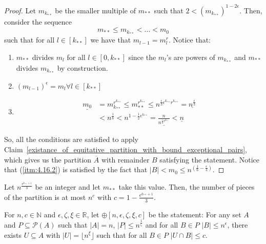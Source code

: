         \begin{proof}
            Let $m_{k_{**}}$ be the smaller multiple of $m_{**}$ such that $2 < (m_{k_{**}})^{1-2\epsilon}$.
            Then, consider the sequence
                \[
                    m_{**} \leq m_{k_{**}} < \dots < m_0
                \]
                such that for all $l \in [k_{**}]$ we have that $m_{l-1} = m_l^r$.
            Notice that:
            \begin{enumerate}
                \item $m_{**}$ divides $m_l$ for all $l \in [0, k_{**}]$ since the $m_l$'s are powers of $m_{k_{**}}$
                    and $m_{**}$ divides $m_{k_{**}}$ by construction.
                \item $(m_{l-1})^\epsilon = m_l \forall l \in [k_{**}]$
                \item \[
                    \begin{split}
                        \underline{m_0}
                            & = m_{k_{**}}^{r^{k_{**}}}
                                \leq m_{**}^{r^{k_{**}}}
                                \leq n^{\frac{\epsilon}{3}\epsilon^{k_{**}}r^{k_{**}}}
                                = \underline{n^{\frac{\epsilon}{3}}} \\
                            & < n^{\frac{1}{6}}
                                < n^{1-\frac{1}{2}\epsilon^{k_{**}}}
                                = \underline{\frac{n}{n^{\frac{1}{2}\epsilon^{k_{**}}}}}
                                < \underline{n}
                    \end{split}
                \]
            \end{enumerate}
            So, all the conditions are satisfied to apply Claim~\ref{existance_of_equitative_partition_with_bound_exceptional_pairs},
                which gives us the partition $\overline{A}$ with remainder $B$ satisfying the statement.
            Notice that (\ref{itm:4.16.2}) is satisfied by the fact that $|B| < m_0 \leq n^{\left(\frac{1}{6} - \frac{\epsilon}{3}\right)}$.
        \end{proof}

    \remark
    Let $n^{\frac{\epsilon^{k_{**}+1}}{3}}$ be an integer and let $m_{**}$ take this value.
    Then, the number of pieces of the partition is at most $n^c$ with $c = 1 - \frac{\epsilon^{k_{**}+1}}{3}$.

    \label{n_large_enough_property}
    For $n, c \in \mathbb{N}$ and $\epsilon, \zeta, \xi \in \mathbb{R}$, let $\oplus[n, \epsilon, \zeta, \xi, c]$ be
        the statement:
    For any set $A$ and $P \subseteq \mathcal{P}(A)$ such that $|A| = n$, $|P| \leq n^{\frac{1}{\zeta}}$ and for all
        $B \in P$ $|B| \leq n^\epsilon$, there exists $U \subseteq A$ with $|U| = \lfloor n^\xi \rfloor$ such that
        for all $B \in P$ $|U \cap B| \leq c$.

